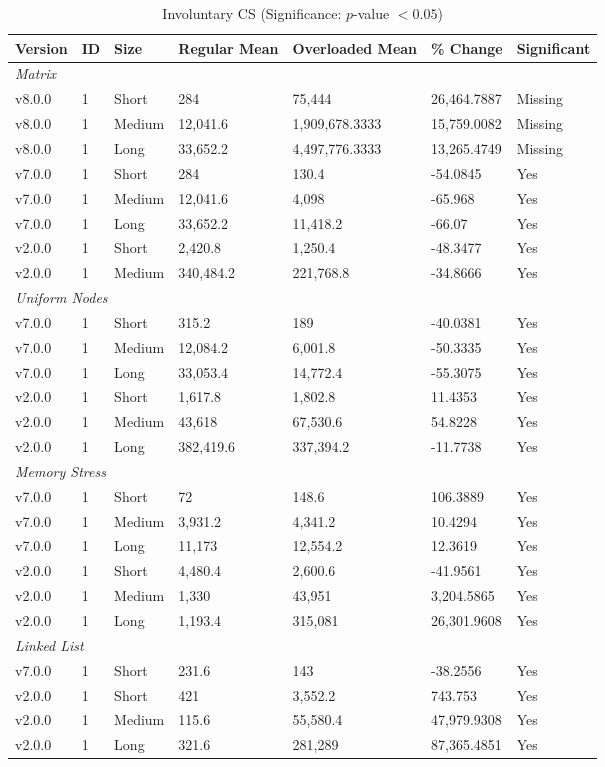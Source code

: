 \begin{table}[H]\caption{Involuntary CS (Significance: $p$-value $<0.05$)}
\centering\footnotesize\setlength{\tabcolsep}{4pt}\renewcommand{\arraystretch}{1.15}
\begin{tabular}{lllllll}
\toprule
Version & ID & Size & Regular Mean & Overloaded Mean & \% Change & Significant \\ \midrule
\multicolumn{7}{l}{\textit{Matrix}} \\
v8.0.0 & 1 & Short & 284 & 75,444 & 26,464.7887 & Missing \\
v8.0.0 & 1 & Medium & 12,041.6 & 1,909,678.3333 & 15,759.0082 & Missing \\
v8.0.0 & 1 & Long & 33,652.2 & 4,497,776.3333 & 13,265.4749 & Missing \\
v7.0.0 & 1 & Short & 284 & 130.4 & -54.0845 & Yes \\
v7.0.0 & 1 & Medium & 12,041.6 & 4,098 & -65.968 & Yes \\
v7.0.0 & 1 & Long & 33,652.2 & 11,418.2 & -66.07 & Yes \\
v2.0.0 & 1 & Short & 2,420.8 & 1,250.4 & -48.3477 & Yes \\
v2.0.0 & 1 & Medium & 340,484.2 & 221,768.8 & -34.8666 & Yes \\
\multicolumn{7}{l}{\textit{Uniform Nodes}} \\
v7.0.0 & 1 & Short & 315.2 & 189 & -40.0381 & Yes \\
v7.0.0 & 1 & Medium & 12,084.2 & 6,001.8 & -50.3335 & Yes \\
v7.0.0 & 1 & Long & 33,053.4 & 14,772.4 & -55.3075 & Yes \\
v2.0.0 & 1 & Short & 1,617.8 & 1,802.8 & 11.4353 & Yes \\
v2.0.0 & 1 & Medium & 43,618 & 67,530.6 & 54.8228 & Yes \\
v2.0.0 & 1 & Long & 382,419.6 & 337,394.2 & -11.7738 & Yes \\
\multicolumn{7}{l}{\textit{Memory Stress}} \\
v7.0.0 & 1 & Short & 72 & 148.6 & 106.3889 & Yes \\
v7.0.0 & 1 & Medium & 3,931.2 & 4,341.2 & 10.4294 & Yes \\
v7.0.0 & 1 & Long & 11,173 & 12,554.2 & 12.3619 & Yes \\
v2.0.0 & 1 & Short & 4,480.4 & 2,600.6 & -41.9561 & Yes \\
v2.0.0 & 1 & Medium & 1,330 & 43,951 & 3,204.5865 & Yes \\
v2.0.0 & 1 & Long & 1,193.4 & 315,081 & 26,301.9608 & Yes \\
\multicolumn{7}{l}{\textit{Linked List}} \\
v7.0.0 & 1 & Short & 231.6 & 143 & -38.2556 & Yes \\
v2.0.0 & 1 & Short & 421 & 3,552.2 & 743.753 & Yes \\
v2.0.0 & 1 & Medium & 115.6 & 55,580.4 & 47,979.9308 & Yes \\
v2.0.0 & 1 & Long & 321.6 & 281,289 & 87,365.4851 & Yes \\
\bottomrule\end{tabular}
\label{InvoluntaryContextSwitchMetrics}
\par\smallskip\parbox{0.95\textwidth}{\scriptsize}
\end{table}